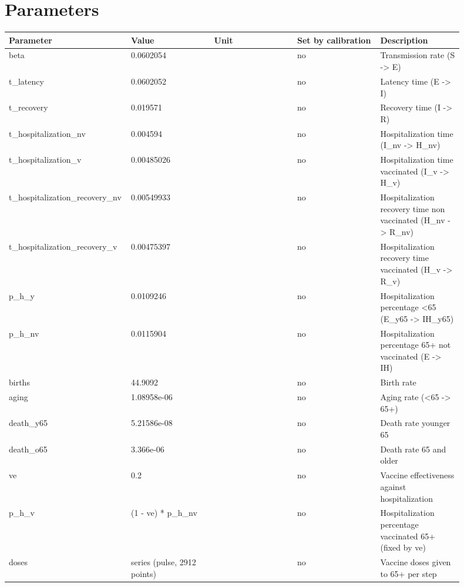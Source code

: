 \documentclass{article}
\begin{document}
\section*{Parameters}
\begin{longtable}{p{0.18\linewidth}p{0.18\linewidth}p{0.18\linewidth}p{0.18\linewidth}p{0.18\linewidth}}
Parameter & Value & Unit & Set by calibration & Description \\
\hline
\endhead
beta & 0.0602054 &  & no & Transmission rate (S -\textgreater{} E) \\
t\_latency & 0.0602052 &  & no & Latency time (E -\textgreater{} I) \\
t\_recovery & 0.019571 &  & no & Recovery time (I -\textgreater{} R) \\
t\_hospitalization\_nv & 0.004594 &  & no & Hospitalization time (I\_nv -\textgreater{} H\_nv) \\
t\_hospitalization\_v & 0.00485026 &  & no & Hospitalization time vaccinated (I\_v -\textgreater{} H\_v) \\
t\_hospitalization\_recovery\_nv & 0.00549933 &  & no & Hospitalization recovery time non vaccinated (H\_nv -\textgreater{} R\_nv) \\
t\_hospitalization\_recovery\_v & 0.00475397 &  & no & Hospitalization recovery time vaccinated (H\_v -\textgreater{} R\_v) \\
p\_h\_y & 0.0109246 &  & no & Hospitalization percentage \textless{}65 (E\_y65 -\textgreater{} IH\_y65) \\
p\_h\_nv & 0.0115904 &  & no & Hospitalization percentage 65+ not vaccinated (E -\textgreater{} IH) \\
births & 44.9092 &  & no & Birth rate \\
aging & 1.08958e-06 &  & no & Aging rate (\textless{}65 -\textgreater{} 65+) \\
death\_y65 & 5.21586e-08 &  & no & Death rate younger 65 \\
death\_o65 & 3.366e-06 &  & no & Death rate 65 and older \\
ve & 0.2 &  & no & Vaccine effectiveness against hospitalization \\
p\_h\_v & (1 - ve) * p\_h\_nv &  & no & Hospitalization percentage vaccinated 65+ (fixed by ve) \\
doses & series (pulse, 2912 points) &  & no & Vaccine doses given to 65+ per step \\
\end{longtable}
\end{document}
